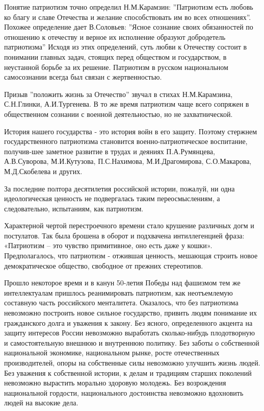 \documentclass[a4paper,14pt]{extreport}
\begin{document}
Понятие патриотизм точно определил Н.М.Карамзин: ''Патриотизм есть любовь ко благу и славе Отечества и желание способствовать им во всех отношениях''. Похожее определение дает В.Соловьев: ''Ясное сознание своих обязанностей по отношению к отечеству и верное их исполнение образуют добродетель патриотизма''   Исходя из этих определений, суть любви к Отечеству состоит в понимании главных задач, стоящих перед обществом и государством, в неустанной борьбе за их решение. Патриотизм в русском национальном самосознании всегда был связан с жертвенностью. 

Призыв ''положить жизнь за Отечество'' звучал в стихах Н.М.Карамзина, С.Н.Глинки, А.И.Тургенева. В то же время патриотизм чаще всего сопряжен в общественном сознании с военной деятельностью, но не захватнической.

История нашего государства - это история войн в его защиту. Поэтому стержнем государственного патриотизма становится военно-патриотическое воспитание, получив-шее заметное развитие в трудах и деяниях П.А.Румянцева, А.В.Суворова, М.И.Кутузова, П.С.Нахимова, М.И.Драгомирова, С.О.Макарова, М.Д.Скобелева и других.

За последние полтора десятилетия российской истории, пожалуй, ни одна идеологическая ценность не подвергалась таким переосмыслениям, а следовательно, испытаниям, как патриотизм.

Характерной чертой перестроечного времени стало крушение различных догм и постулатов. Так была брошена в оборот и подхвачена интиллегенцией фраза: «Патриотизм – это чувство примитивное, оно есть даже у кошки».  Предполагалось, что патриотизм - отжившая ценность, мешающая строить новое демократическое общество, свободное от прежних стереотипов.

Прошло некоторое время и в канун 50-летия Победы над фашизмом тем же интеллектуалам пришлось реанимировать патриотизм, как неотъемлемую составную часть российского менталитета. Оказалось, что без патриотизма невозможно построить новое сильное государство, привить людям понимание их гражданского долга и уважения к закону. Без ясного, определенного акцента на защиту интересов России невозможно выработать сколько-нибудь плодотворную и самостоятельную внешнюю и внутреннюю политику. Без заботы о собственной национальной экономике, национальном рынке, росте отечественных производителей, опоры на собственные силы невозможно улучшить жизнь людей. Без уважения к собственной истории, к делам и традициям старших поколений невозможно вырастить морально здоровую молодежь. Без возрождения национальной гордости, национального достоинства невозможно вдохновить людей на высокие дела.
\end{document}
